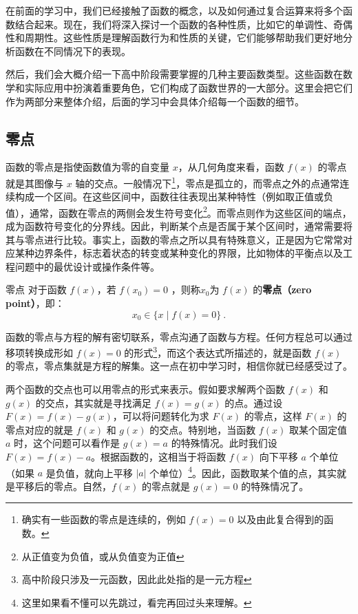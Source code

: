 

在前面的学习中，我们已经接触了函数的概念，以及如何通过复合运算来将多个函数结合起来。现在，我们将深入探讨一个函数的各种性质，比如它的单调性、奇偶性和周期性。这些性质是理解函数行为和性质的关键，它们能够帮助我们更好地分析函数在不同情况下的表现。

然后，我们会大概介绍一下高中阶段需要掌握的几种主要函数类型。这些函数在数学和实际应用中扮演着重要角色，它们构成了函数世界的一大部分。这里会把它们作为两部分来整体介绍，后面的学习中会具体介绍每一个函数的细节。

\subsection{零点}\label{sub_HsFunC_3}

函数的零点是指使函数值为零的自变量 $x$，从几何角度来看，函数 $f(x)$ 的零点就是其图像与 $x$ 轴的交点。一般情况下\footnote{确实有一些函数的零点是连续的，例如 $f(x) = 0$ 以及由此复合得到的函数。}，零点是孤立的，而零点之外的点通常连续构成一个区间。在这些区间中，函数往往表现出某种特性（例如取正值或负值），通常，函数在零点的两侧会发生符号变化\footnote{从正值变为负值，或从负值变为正值}。而零点则作为这些区间的端点，成为函数符号变化的分界线。因此，判断某个点是否属于某个区间时，通常需要将其与零点进行比较。事实上，函数的零点之所以具有特殊意义，正是因为它常常对应某种边界条件，标志着状态的转变或某种变化的界限，比如物体的平衡点以及工程问题中的最优设计或操作条件等。

\begin{definition}{零点}
对于函数 $f(x)$，若 $f(x_0) = 0$ ，则称$x_0$为 $f(x)$ 的\textbf{零点（zero point）}，即：
\begin{equation}
x_0 \in \{ x \mid f(x) = 0 \}~.
\end{equation}
\end{definition}

函数的零点与方程的解有密切联系，零点沟通了函数与方程。任何方程总可以通过移项转换成形如 $f(x) = 0$ 的形式\footnote{高中阶段只涉及一元函数，因此此处指的是一元方程}，而这个表达式所描述的，就是函数 $f(x)$ 的零点，零点集就是方程的解集。这一点在初中学习时，相信你就已经感受过了。

两个函数的交点也可以用零点的形式来表示。假如要求解两个函数 $f(x)$ 和 $g(x)$ 的交点，其实就是寻找满足 $f(x) = g(x)$ 的点。通过设 $F(x) = f(x) - g(x)$，可以将问题转化为求 $F(x)$ 的零点，这样 $F(x)$ 的零点对应的就是 $f(x)$ 和 $g(x)$ 的交点。特别地，当函数 $f(x)$ 取某个固定值 $a$ 时，这个问题可以看作是 $g(x) = a$ 的特殊情况。此时我们设 $F(x) = f(x) - a$。根据函数的，这相当于将函数 $f(x)$ 向下平移 $a$ 个单位（如果 $a$ 是负值，就向上平移 $|a|$ 个单位）\footnote{这里如果看不懂可以先跳过，看完再回过头来理解。}。因此，函数取某个值的点，其实就是平移后的零点。自然，$f(x)$ 的零点就是 $g(x) = 0$ 的特殊情况了。

